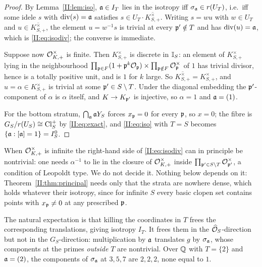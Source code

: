 \begin{proof}
By Lemma~\ref{II:lem:iso}, $\mathfrak{a}\in I_T$ lies in the isotropy iff $\sigma_{\mathfrak{a}}\in r(U_T)$, i.e.\
iff some idele $s$ with $\mathrm{div}(s)=\mathfrak{a}$ satisfies $s\in U_T\cdot\overline{K^\times_{S,+}}$.
Writing $s=wu$ with $w\in U_T$ and $u\in\overline{K^\times_{S,+}}$, the element $u=w^{-1}s$
is trivial at every $\mathfrak{p}'\notin T$ and has $\mathrm{div}(u)=\mathfrak{a}$, which is \eqref{II:eq:isodiv};
the converse is immediate.

Suppose now $\mathcal{O}^\times_{K,+}$ is finite. Then $K^\times_{S,+}$ is discrete in $\mathbb{I}_S$: an
element of $K^\times_{S,+}$ lying in the neighbourhood $\prod_{\mathfrak{p}\in F}(1+\mathfrak{p}^k\mathcal{O}_{\mathfrak{p}})\times\prod_{\mathfrak{p}\notin F}\mathcal{O}_{\mathfrak{p}}^\times$
of $1$ has trivial divisor, hence is a totally positive unit, and is $1$ for $k$ large. So
$\overline{K^\times_{S,+}}=K^\times_{S,+}$, and $u=\alpha\in K^\times_{S,+}$ is trivial at some
$\mathfrak{p}'\in S\setminus T$. Under the diagonal embedding the $\mathfrak{p}'$-component of $\alpha$ is
$\alpha$ itself, and $K\to K_{\mathfrak{p}'}$ is injective, so $\alpha=1$ and $\mathfrak{a}=(1)$.

For the bottom stratum, $\bigcap_{\mathfrak{a}}\mathfrak{a} Y_S$ forces $x_{\mathfrak{p}}=0$ for every $\mathfrak{p}$, so $x=0$;
the fibre is $G_S/r(U_S)\cong\operatorname{Cl}^+_S$ by \eqref{II:eq:exact}, and \eqref{II:eq:iso} with $T=S$
becomes $\{\mathfrak{a}:[\mathfrak{a}]=1\}=I_S^0$.
\end{proof}

\begin{remark}\label{II:rem:leopoldt}
When $\mathcal{O}^\times_{K,+}$ is infinite the right-hand side of \eqref{II:eq:isodiv} can in
principle be nontrivial: one needs $\alpha^{-1}$ to lie in the closure of
$\mathcal{O}^\times_{K,+}$ inside $\prod_{\mathfrak{p}'\in S\setminus T}\mathcal{O}^\times_{\mathfrak{p}'}$, a condition of
Leopoldt type. We do not decide it. Nothing below depends on it:
Theorem~\ref{II:thm:principal} needs only that the strata are nowhere dense, which holds
whatever their isotropy, since for infinite $S$ every basic clopen set contains points with
$x_{\mathfrak{p}}\ne0$ at any prescribed $\mathfrak{p}$.
\end{remark}

\begin{remark}\label{II:rem:whynojump}
The natural expectation is that killing the coordinates in $T$ frees the corresponding
translations, giving isotropy $I_T$. It frees them in the $\widehat{\mathcal{O}}_S$-direction but not in the
$G_S$-direction: multiplication by $\mathfrak{a}$ translates $g$ by $\sigma_{\mathfrak{a}}$, whose components
at the primes \emph{outside} $T$ are nontrivial. Over $\mathbb{Q}$ with $T=\{2\}$ and $\mathfrak{a}=(2)$,
the components of $\sigma_{\mathfrak{a}}$ at $3,5,7$ are $2,2,2$, none equal to $1$.
\end{remark}

